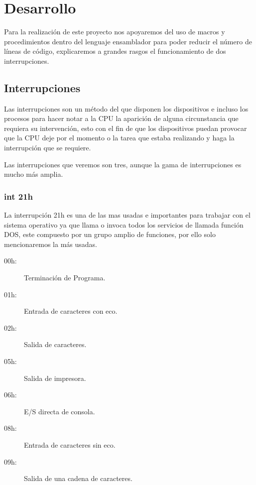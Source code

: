 \documentclass[letterpaper,12 pt,titlepage]{article}
\begin{document}
    \section{Desarrollo}

    Para la realización de este proyecto nos apoyaremos del uso de macros y procedimientos dentro del lenguaje ensamblador para poder reducir el número de líneas de código, explicaremos a grandes rasgos el funcionamiento de dos interrupciones.
    
    \subsection{Interrupciones}
    Las interrupciones son un método del que disponen los dispositivos e incluso los procesos para hacer notar a la CPU la aparición de alguna circunstancia que requiera su intervención, esto con el fin de que los dispositivos puedan provocar que la CPU deje por el momento o la tarea que estaba realizando y haga la interrupción que se requiere.
        
    Las interrupciones que veremos son tres, aunque la gama de interrupciones es mucho más amplia.
    \subsubsection{int 21h}
    La interrupción 21h es una de las mas usadas e importantes para trabajar con el sistema operativo ya que llama o invoca todos los servicios de llamada función DOS, este compuesto por un grupo amplio de funciones, por ello solo mencionaremos la más usadas.

    \begin{center}
        \begin{minipage}{0.85\linewidth}
            \begin{description}
                \item[00h:] Terminación de Programa.
                \item[01h:] Entrada de caracteres con eco.
                \item[02h:] Salida de caracteres.
                \item[05h:] Salida de impresora.
                \item[06h:] E/S directa de consola.
                \item[08h:] Entrada de caracteres sin eco.
                \item[09h:] Salida de una cadena de caracteres.
            \end{description}
        \end{minipage}
    \end{center}
    
\end{document}
